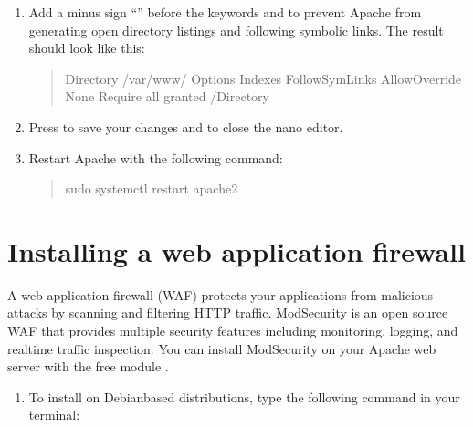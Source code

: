 \documentclass[a4paper,10pt,english,openany,oneside]{sphinxmanual}
\begin{document}
\begin{sloppypar}
\begin{enumerate}
\item {} 
\sphinxAtStartPar
Add a minus sign “\sphinxhyphen{}” before the keywords  and  to prevent Apache from generating open directory listings and following symbolic links. The result should look like this:
\begin{quote}

\begin{sphinxVerbatim}[commandchars=\\\{\}]
\PYGZlt{}Directory /var/www/\PYGZgt{}
        Options \PYGZhy{}Indexes \PYGZhy{}FollowSymLinks
        AllowOverride None
        Require all granted
\PYGZlt{}/Directory\PYGZgt{}
\end{sphinxVerbatim}
\end{quote}

\item {} 
\sphinxAtStartPar
Press  to save your changes and  to close the nano editor.

\item {} 
\sphinxAtStartPar
Restart Apache with the following command:
\begin{quote}

\begin{sphinxVerbatim}[commandchars=\\\{\}]
\PYGZdl{} sudo systemctl restart apache2
\end{sphinxVerbatim}
\end{quote}

\end{enumerate}


\section{Installing a web application firewall}
\label{\detokenize{hardening-apache:installing-a-web-application-firewall}}
\sphinxAtStartPar
A web application firewall (WAF) protects your applications from malicious attacks by scanning and filtering HTTP traffic. ModSecurity is an open source WAF that provides multiple security features including monitoring, logging, and real\sphinxhyphen{}time traffic inspection. You can install ModSecurity on your Apache web server with the free module .
\begin{enumerate}
%
\item {} 
\sphinxAtStartPar
To install  on Debian\sphinxhyphen{}based distributions, type the following command in your terminal:
\begin{quote}


\end{quote}
\end{enumerate}
\end{sloppypar}
\end{document}
